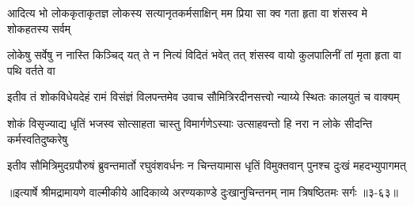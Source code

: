 \twolineshloka
{आदित्य भो लोककृताकृतज्ञ लोकस्य सत्यानृतकर्मसाक्षिन्}
{मम प्रिया सा क्व गता हृता वा शंसस्व मे शोकहतस्य सर्वम्} %

\twolineshloka
{लोकेषु सर्वेषु न नास्ति किञ्चिद् यत् ते न नित्यं विदितं भवेत् तत्}
{शंसस्व वायो कुलपालिनीं तां मृता हृता वा पथि वर्तते वा} %

\twolineshloka
{इतीव तं शोकविधेयदेहं रामं विसंज्ञं विलपन्तमेव}
{उवाच सौमित्रिरदीनसत्त्वो न्याय्ये स्थितः कालयुतं च वाक्यम्} %

\twolineshloka
{शोकं विसृज्याद्य धृतिं भजस्व सोत्साहता चास्तु विमार्गणेऽस्याः}
{उत्साहवन्तो हि नरा न लोके सीदन्ति कर्मस्वतिदुष्करेषु} %

\twolineshloka
{इतीव सौमित्रिमुदग्रपौरुषं ब्रुवन्तमार्तो रघुवंशवर्धनः}
{न चिन्तयामास धृतिं विमुक्तवान् पुनश्च दुःखं महदभ्युपागमत्} %


॥इत्यार्षे श्रीमद्रामायणे वाल्मीकीये आदिकाव्ये अरण्यकाण्डे दुःखानुचिन्तनम् नाम त्रिषष्ठितमः सर्गः ॥३-६३॥
